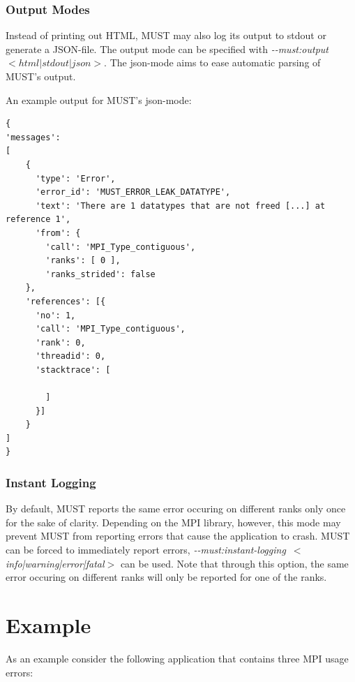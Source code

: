 \documentclass[english]{scrartcl}
\begin{document}
\subsubsection{Output Modes}
Instead of printing out HTML, MUST may also log its output to stdout or generate a JSON-file.
The output mode can be specified with \mbox{\emph{\mbox{-{}-must:output $<html|stdout|json>$}}}.
The json-mode aims to ease automatic parsing of MUST's output.

An example output for MUST's json-mode:

\begin{lstlisting}[tabsize=3,numbers=none,basicstyle=\scriptsize,%
	breaklines=true, frame=single,%
    commentstyle=\color{LGREY}, keywordstyle=\bfseries,%
    numbers=left, numbersep=5pt,numberstyle=\tiny,%
	name=example-interface-listing, firstnumber=1]
{
'messages': 
[
    {
      'type': 'Error',
      'error_id': 'MUST_ERROR_LEAK_DATATYPE',
      'text': 'There are 1 datatypes that are not freed [...] at reference 1',
      'from': {
        'call': 'MPI_Type_contiguous',
        'ranks': [ 0 ],
        'ranks_strided': false
    },
    'references': [{
      'no': 1,
      'call': 'MPI_Type_contiguous',
      'rank': 0,
      'threadid': 0,
      'stacktrace': [

        ]
      }]
    }
]
}
\end{lstlisting}
\subsubsection{Instant Logging}
By default, MUST reports the same error occuring on different ranks only once for the sake of clarity.
Depending on the MPI library, however, this mode may prevent MUST from reporting errors that cause the application to crash.
MUST can be forced to immediately report errors, \mbox{\emph{\mbox{-{}-must:instant-logging $<$info|warning|error|fatal$>$}}} can be used.
Note that through this option, the same error occuring on different ranks will only be reported for one of the ranks.

\section{Example}
As an example consider the following application that contains three MPI usage
errors:
\end{document}
